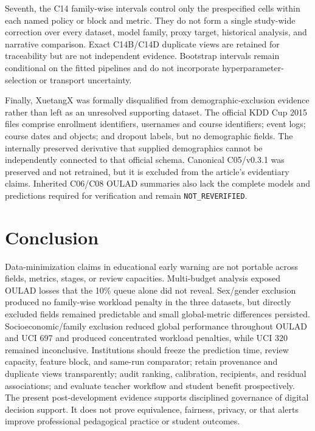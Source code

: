 \documentclass[11pt]{article}
\begin{document}
Seventh, the C14 family-wise intervals control only the prespecified cells within each named policy or block and metric. They do not form a single study-wide correction over every dataset, model family, proxy target, historical analysis, and narrative comparison. Exact C14B/C14D duplicate views are retained for traceability but are not independent evidence. Bootstrap intervals remain conditional on the fitted pipelines and do not incorporate hyperparameter-selection or transport uncertainty.

Finally, XuetangX was formally disqualified from demographic-exclusion evidence rather than left as an unresolved supporting dataset. The official KDD Cup 2015 files comprise enrollment identifiers, usernames and course identifiers; event logs; course dates and objects; and dropout labels, but no demographic fields. The internally preserved derivative that supplied demographics cannot be independently connected to that official schema. Canonical C05/v0.3.1 was preserved and not retrained, but it is excluded from the article's evidentiary claims. Inherited C06/C08 OULAD summaries also lack the complete models and predictions required for verification and remain \texttt{NOT\_REVERIFIED}.

\section{Conclusion}

Data-minimization claims in educational early warning are not portable across fields, metrics, stages, or review capacities. Multi-budget analysis exposed OULAD losses that the 10\% queue alone did not reveal. Sex/gender exclusion produced no family-wise workload penalty in the three datasets, but directly excluded fields remained predictable and small global-metric differences persisted. Socioeconomic/family exclusion reduced global performance throughout OULAD and UCI 697 and produced concentrated workload penalties, while UCI 320 remained inconclusive. Institutions should freeze the prediction time, review capacity, feature block, and same-run comparator; retain provenance and duplicate views transparently; audit ranking, calibration, recipients, and residual associations; and evaluate teacher workflow and student benefit prospectively. The present post-development evidence supports disciplined governance of digital decision support. It does not prove equivalence, fairness, privacy, or that alerts improve professional pedagogical practice or student outcomes.
\end{document}
